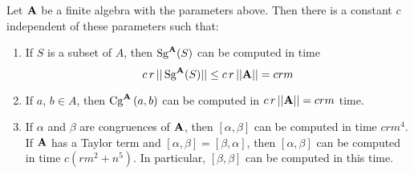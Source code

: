 \begin{prop}\label{speedprop}
Let $\alg A$ be a finite algebra with the parameters above. Then
there is a constant $c$ independent of these parameters
such that:
\begin{enumerate}
\item \label{speed1} If $S$ is a subset of $A$,
then $\Sg^{\alg A}(S)$ can be computed
in time
\[
c\, r\,||\Sg^{\alg A}(S)|| \le c\, r\,||\alg A|| = crm
\]
\item \label{speed2} If $a$, $b \in A$, then $\Cga a b A$ can be
computed in
$c\, r\, ||\alg A|| = crm$ time.
\item \label{speed3}
If $\alpha$ and $\beta$ are congruences of $\alg A$,
then $[\alpha,\beta]$ can be computed in time $crm^4$.
If $\alg A$ has a Taylor term and $[\alpha,\beta] = [\beta,\alpha]$,
then $[\alpha,\beta]$ can be computed in time $c(rm^2 + n^5)$.
In particular, $[\beta,\beta]$ can be computed in this time.
\end{enumerate}
\end{prop}

